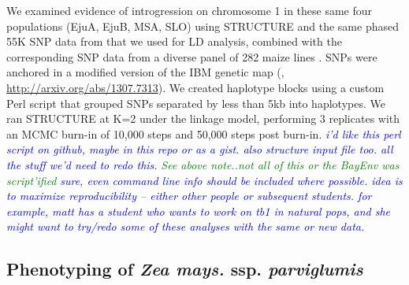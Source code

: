 \documentclass[12pt]{article}
\newcommand{\jri}[1]{\textcolor{blue}{ \emph{\scriptsize  #1}} }
\newcommand{\lev}[1]{\textcolor{green}{\emph{\scriptsize #1}} }
\begin{document}
We examined evidence of introgression on chromosome 1 in these same four populations (EjuA, EjuB, MSA, SLO) using STRUCTURE \citep{Falush2003} and the same phased 55K SNP data from \citep{Pyhajarvi2013} that we used for LD analysis, combined with the corresponding SNP data from a diverse panel of 282 maize lines \citep{Cook2012}. SNPs were anchored in a modified version of the IBM genetic map (\citep{Gerke2013}, \url{http://arxiv.org/abs/1307.7313}). We created haplotype blocks using a custom Perl script that grouped SNPs separated by less than 5kb into haplotypes. We ran STRUCTURE at K=2 under the linkage model, performing 3 replicates with an MCMC burn-in of 10,000 steps and 50,000 steps post burn-in. \jri{i'd like this perl script on github, maybe in this repo or as a gist. also structure input file too. all the stuff we'd need to redo this.} \lev{See above note..not all of this or the BayEnv was script'ified} \jri{sure, even command line info should be included where possible.  idea is to maximize reproducibility -- either other people or subsequent students. for example, matt has a student who wants to work on tb1 in natural pops, and she might want to try/redo some of these analyses with the same or new data.}

\subsection*{Phenotyping of \emph{Zea mays.} ssp. \emph{parviglumis}}
\end{document}
